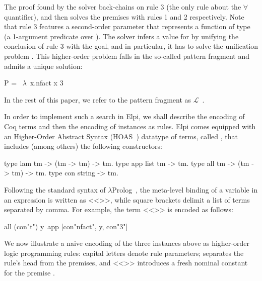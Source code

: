 \documentclass[sigconf,natbib=false,review]{acmart}
\newcommand{\llambda}{\ensuremath{\mathcal{L}}\xspace}
\begin{document}
\noindent
The proof found by the solver back-chains on rule 3 (the only rule
about the $\forall$ quantifier), and then solves the premises with
rules 1 and 2 respectively.
Note that rule 3 features a second-order parameter  that represents
a function of type  (a 1-argument predicate over ).
The solver infers a value for  by unifying the conclusion
of rule 3 with the goal, and in particular, it has to solve the unification
problem . This higher-order problem falls in the so-called 
pattern fragment and admits a unique solution:
\begin{elpicode}
P = ~$\lambda$~x.nfact x 3                                       ~~
\end{elpicode}
In the rest of this paper, we refer to the pattern fragment as
\llambda~\cite{miller92jsc}.

In order to implement such a search in Elpi, we shall describe the encoding
of Coq terms and then the encoding of instances as rules.
Elpi comes equipped with
an Higher-Order Abstract Syntax (HOAS~\cite{10.1145/53990.54010}) datatype of
terms, called , that includes (among others) the following
constructors:

\begin{elpicode}
type lam  tm -> (tm -> tm) -> tm.     %
type app  list tm -> tm.              %
type all  tm -> (tm -> tm) -> tm.     %
type con  string -> tm.               %
\end{elpicode}

\noindent
Following the standard syntax of $\lambda$Prolog~\cite{miller_nadathur_2012},
the meta-level binding of a variable  in an expression
 is written as <<>>, while square brackets delimit a
list of terms separated by comma. For example, the term
<<>> is encoded as follows:

\begin{elpicode}
all (con"t") y\ app [con"nfact", y, con"3"]
\end{elpicode}

\noindent
We now illustrate a naive encoding of the three instances above as higher-order
logic programming rules: capital letters denote rule
parameters; \elpiIn{:-} separates the rule's head from the premises, and
<<>> introduces a fresh nominal constant 
for the premise .
\end{document}
